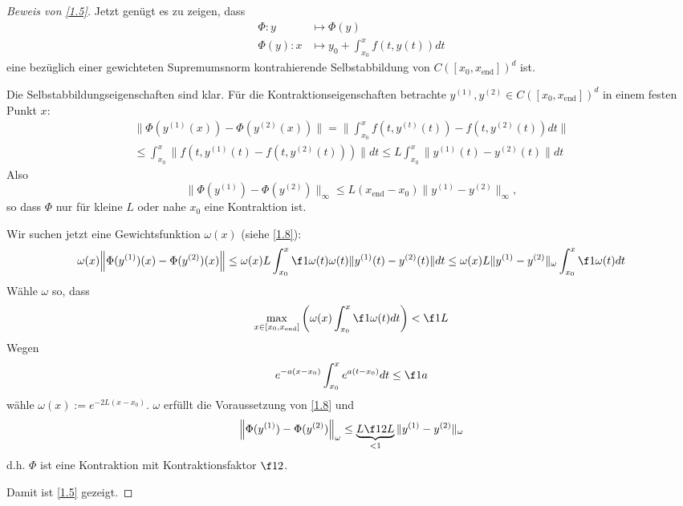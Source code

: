 \documentclass[
]{mycourse}
\begin{document}
\begin{proof}[Beweis von \ref{1.5}]
	Jetzt genügt es zu zeigen, dass
	\begin{align*}
		\Phi: y &\mapsto \Phi(y) \\
		\Phi(y): x &\mapsto y_0 + \int_{x_0}^x f(t,y(t)) dt
	\end{align*}
	eine bezüglich einer gewichteten Supremumsnorm kontrahierende Selbstabbildung von $C([x_0,x_{\text{end}}])^d$ ist.

	Die Selbstabbildungseigenschaften sind klar.
	Für die Kontraktionseigenschaften betrachte $y^{(1)}, y^{(2)} \in C([x_0,x_\text{end}])^d$ in einem festen Punkt $x$:
	\begin{align*}
		\|\Phi(y^{(1)}(x)) - \Phi(y^{(2)}(x))\|
		= \bigg\| \int_{x_0}^x f(t,y^{(t)}(t)) - f(t,y^{(2)}(t)) dt \bigg\| \\
		\le \int_{x_0}^x \| f(t, y^{(1)}(t) - f(t, y^{(2)}(t))) \| dt
		\le L \int_{x_0}^x \| y^{(1)}(t) - y^{(2)}(t) \| dt
	\end{align*}
	Also
	\[
		\|\Phi(y^{(1)}) - \Phi(y^{(2)}) \|_\infty \le L(x_{\text{end}}-x_0) \|y^{(1)}  - y^{(2)}\|_\infty,
	\]
	so dass $\Phi$ nur für kleine $L$ oder nahe $x_0$ eine Kontraktion ist.

	Wir suchen jetzt eine Gewichtsfunktion $\omega(x)$ (siehe \ref{1.8}): \fixme[übersichtlicher!]
	\[
		\omega(x) \Big\|\Phi(y^{(1)})(x) - \Phi(y^{(2)})(x) \Big\| 
		\le \omega(x) L \int_{x_0}^x \f 1{\omega(t)} \omega(t) \|y^{(1)}(t) - y^{(2)}(t) \| dt
		\le \omega(x) L\|y^{(1)} - y^{(2)} \|_\omega \int_{x_0}^x \f 1{\omega(t)} dt 
	\]
	Wähle $\omega$ so, dass
	\[
		\max_{x\in [x_0,x_{\text{end}}]} \bigg( \omega(x) \int_{x_0}^x \f 1 {\omega(t)} dt  \bigg)
		< \f 1L
	\]
	Wegen
	\[
		e^{-a(x-x_0)} \int_{x_0}^x e^{a(t-x_0)} dt \le \f 1a
	\]
	wähle $\omega(x) := e^{- 2L (x-x_0)}$.
	$\omega$ erfüllt die Voraussetzung von \ref{1.8} und
	\[
		\Big\|\Phi(y^{(1)}) - \Phi(y^{(2)}) \Big\|_{\omega} \le \underbrace{ L \f 1{2L}}_{< 1} \|y^{(1)} - y^{(2)}\|_\omega
	\]
	d.h. $\Phi$ ist eine Kontraktion mit Kontraktionsfaktor $\f 12$.

	Damit ist \ref{1.5} gezeigt.
\end{proof}
\end{document}
